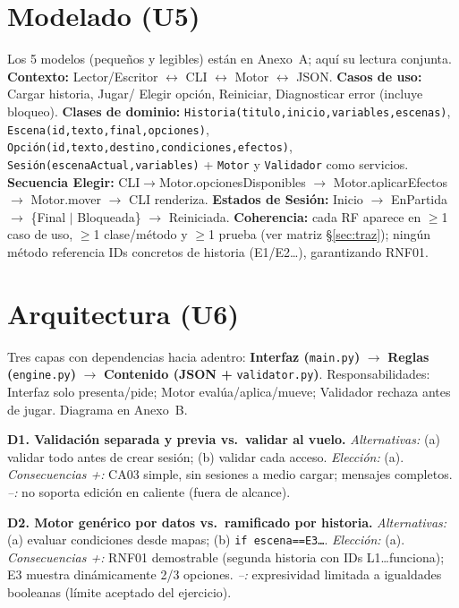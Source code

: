 \documentclass[11pt,a4paper]{article}
\begin{document}
\section{Modelado (U5)}
Los 5 modelos (peque\~nos y legibles) est\'an en Anexo~A; aqu\'i su lectura conjunta. \textbf{Contexto:} Lector/Escritor $\leftrightarrow$ CLI $\leftrightarrow$ Motor $\leftrightarrow$ JSON. \textbf{Casos de uso:} Cargar historia, Jugar/ Elegir opci\'on, Reiniciar, Diagnosticar error (incluye bloqueo). \textbf{Clases de dominio:} \texttt{Historia(titulo,inicio,variables,escenas)}, \texttt{Escena(id,texto,final,opciones)}, \texttt{Opci\'on(id,texto,destino,condiciones,efectos)}, \texttt{Sesi\'on(escenaActual,variables)} + \texttt{Motor} y \texttt{Validador} como servicios. \textbf{Secuencia Elegir:} CLI$\to$Motor.opcionesDisponibles $\to$ Motor.aplicarEfectos $\to$ Motor.mover $\to$ CLI renderiza. \textbf{Estados de Sesi\'on:} Inicio $\to$ EnPartida $\to$ \{Final $|$ Bloqueada\} $\to$ Reiniciada. \textbf{Coherencia:} cada RF aparece en $\geq$1 caso de uso, $\geq$1 clase/m\'etodo y $\geq$1 prueba (ver matriz \S\ref{sec:traz}); ning\'un m\'etodo referencia IDs concretos de historia (E1/E2\ldots), garantizando RNF01.

\section{Arquitectura (U6)}
Tres capas con dependencias hacia adentro: \textbf{Interfaz (}\texttt{main.py}\textbf{)} $\to$ \textbf{Reglas (}\texttt{engine.py}\textbf{)} $\to$ \textbf{Contenido (JSON + }\texttt{validator.py}\textbf{)}. Responsabilidades: Interfaz solo presenta/pide; Motor eval\'ua/aplica/mueve; Validador rechaza antes de jugar. Diagrama en Anexo~B.

\textbf{D1. Validaci\'on separada y previa vs.\ validar al vuelo.} \textit{Alternativas:} (a) validar todo antes de crear sesi\'on; (b) validar cada acceso. \textit{Elecci\'on:} (a). \textit{Consecuencias +:} CA03 simple, sin sesiones a medio cargar; mensajes completos. \textit{--:} no soporta edici\'on en caliente (fuera de alcance).

\textbf{D2. Motor gen\'erico por datos vs.\ ramificado por historia.} \textit{Alternativas:} (a) evaluar condiciones desde mapas; (b) \texttt{if escena==E3\ldots}. \textit{Elecci\'on:} (a). \textit{Consecuencias +:} RNF01 demostrable (segunda historia con IDs L1\ldots funciona); E3 muestra din\'amicamente 2/3 opciones. \textit{--:} expresividad limitada a igualdades booleanas (l\'imite aceptado del ejercicio).
\end{document}
